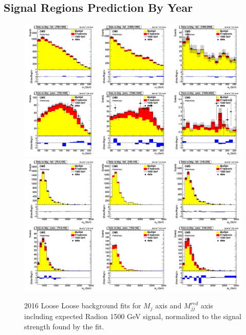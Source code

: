 \subsection{Signal Regions Prediction By Year\label{ss:BkgInSigRegionByYear}}
\begin{figure}[!htb]
	\centering
	\includegraphics[width=1\textwidth]{Figures/postfit_projx_fits_16LL.png}
	\includegraphics[width=1\textwidth]{Figures/postfit_projy_fits_16LL.png}
	\caption{2016 Loose Loose background fits for $M_j$ axis and $M_{jj}^{red}$ axis including expected Radion 1500 GeV signal, normalized to the signal strength found by the fit.}
	\label{fig:16LL}
\end{figure}
